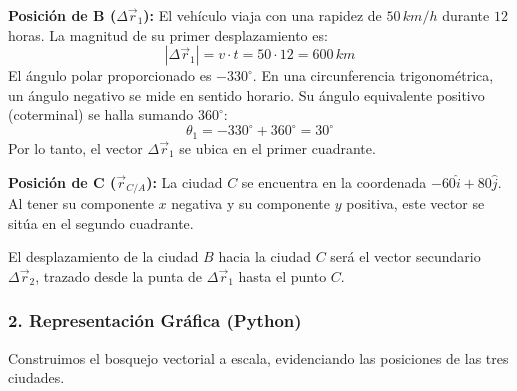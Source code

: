 \documentclass[12pt, a4paper]{article}
\begin{document}
\textbf{Posición de B ($\Delta\vec{r}_1$):}
El vehículo viaja con una rapidez de $50 \, \si{km/h}$ durante $12$ horas. La magnitud de su primer desplazamiento es:
$$ |\Delta\vec{r}_1| = v \cdot t = 50 \cdot 12 = 600 \, \si{km} $$
El ángulo polar proporcionado es $-330^\circ$. En una circunferencia trigonométrica, un ángulo negativo se mide en sentido horario. Su ángulo equivalente positivo (coterminal) se halla sumando $360^\circ$:
$$ \theta_1 = -330^\circ + 360^\circ = 30^\circ $$
Por lo tanto, el vector $\Delta\vec{r}_1$ se ubica en el primer cuadrante.

\textbf{Posición de C ($\vec{r}_{C/A}$):}
La ciudad $C$ se encuentra en la coordenada $-60\hat{i} + 80\hat{j}$. Al tener su componente $x$ negativa y su componente $y$ positiva, este vector se sitúa en el segundo cuadrante.

El desplazamiento de la ciudad $B$ hacia la ciudad $C$ será el vector secundario $\Delta\vec{r}_2$, trazado desde la punta de $\Delta\vec{r}_1$ hasta el punto $C$.

\subsubsection*{2. Representación Gráfica (Python)}
Construimos el bosquejo vectorial a escala, evidenciando las posiciones de las tres ciudades.
\end{document}

